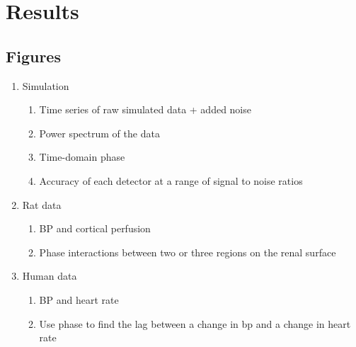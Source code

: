 \documentclass{article}
\begin{document}
\section*{Results}

	\subsection*{Figures}
	\begin{enumerate}
	\item Simulation
		\begin{enumerate}
		\item Time series of raw simulated data + added noise
		\item Power spectrum of the data
		\item Time-domain phase 
		\item Accuracy of each detector at a range of signal to noise ratios
		\end{enumerate}
	\item Rat data
		\begin{enumerate}
		\item BP and cortical perfusion
		\item Phase interactions between two or three regions on the renal surface
		\end{enumerate}
	\item{Human data}
		\begin{enumerate}
		\item BP and heart rate
		\item Use phase to find the lag between a change in bp and a change in heart rate
		\end{enumerate}
	\end{enumerate}
	
\end{document}

